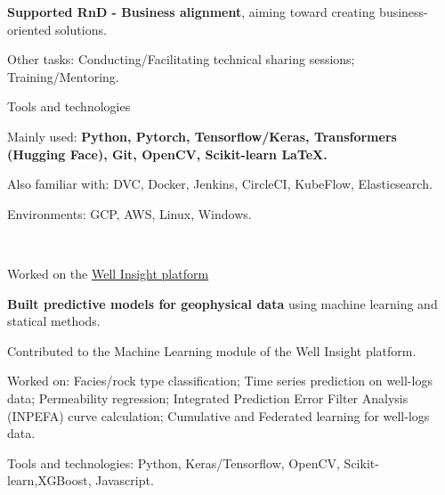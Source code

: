 \begin{xitemize}
    \item \textbf{Supported RnD - Business alignment}, aiming toward creating business-oriented solutions.
    \item Other tasks: Conducting/Facilitating technical sharing sessions; Training/Mentoring.
    \item Tools and technologies
    \begin{zitemize}
        \item Mainly used: \textbf{Python, Pytorch, Tensorflow/Keras, Transformers (Hugging Face), Git, OpenCV, Scikit-learn \LaTeX.}
        \item Also familiar with: DVC, Docker, Jenkins, CircleCI, KubeFlow, Elasticsearch.
        \item Environments: GCP, AWS, Linux, Windows.
    \end{zitemize}
\end{xitemize}

\\
\vspace{-.2em}
\begin{xitemize}
    \item Worked on the \href{https://www.i2g.cloud/well-insight}{Well Insight platform \faUpRightFromSquare}
    \begin{zitemize}
        \item \textbf{Built predictive models for geophysical data} using machine learning and statical methods.
        \item Contributed to the Machine Learning module of the Well Insight platform.
        \item Worked on: Facies/rock type classification; Time series prediction on well-logs data; Permeability regression; Integrated Prediction Error Filter Analysis (INPEFA) curve calculation; Cumulative and Federated learning for well-logs data.
    \end{zitemize}
    \item Tools and technologies: Python, Keras/Tensorflow, OpenCV, Scikit-learn,XGBoost, Javascript.
\end{xitemize}

